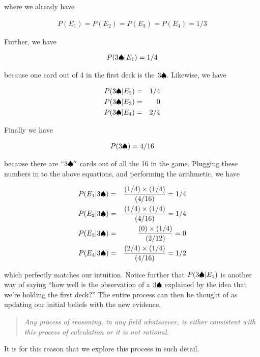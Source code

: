 \documentclass{tufte-book}
\begin{document}
where we already have

\begin{eqnarray*}
P(E_1)=P(E_2)=P(E_3)=P(E_4)=1/3
\end{eqnarray*}

Further, we have

\begin{eqnarray*}
P(3\spadesuit|E_1) = 1/4
\end{eqnarray*}

because one card out of 4 in the first deck is the \(3\spadesuit\).
Likewise, we have

\begin{eqnarray*}
P(3\spadesuit|E_2) &=& 1/4\\
P(3\spadesuit|E_3) &=& 0 \\
P(3\spadesuit|E_4) &=& 2/4 
\end{eqnarray*}

Finally we have

\begin{eqnarray*}
P(3\spadesuit) = 4/16
\end{eqnarray*}

because there are \(``3\spadesuit''\) cards out of all the 16 in the game.
Plugging these numbers in to the above equations, and performing the
arithmetic, we have

\begin{eqnarray*}
P(E_1|3\spadesuit)&=&\frac{(1/4)\times (1/4)}{(4/16)} = 1/4 \\
P(E_2|3\spadesuit)&=&\frac{(1/4)\times (1/4)}{(4/16)} = 1/4 \\
P(E_3|3\spadesuit)&=&\frac{(0)\times (1/4)}{(2/12)} = 0 \\
P(E_4|3\spadesuit)&=&\frac{(2/4)\times (1/4)}{(4/16)} = 1/2 \\
\end{eqnarray*}

which perfectly matches our intuition. Notice further that
\(P(3\spadesuit|E_1)\) is another way of saying ``how well is the
observation of a \(3\spadesuit\) explained by the idea that we're holding
the first deck?'' The entire process can then be thought of as updating
our initial beliefs with the new evidence.

\begin{quote}
\emph{Any process of reasoning, in any field whatsoever, is either
consistent with this process of calculation or it is not rational.}
\end{quote}

It is for this reason that we explore this process in such detail.
\end{document}
